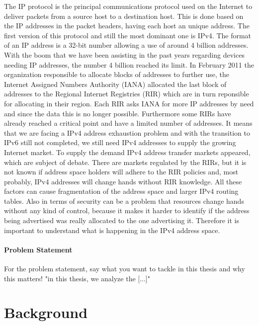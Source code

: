 \documentclass[11pt,a4paper]{scrreprt}
\begin{document}
The IP protocol is the principal communications protocol used on the Internet to deliver packets from a source host to a destination host. This is done based on the IP addresses in the packet headers, having each host an unique address. 
The first version of this protocol and still the most dominant one is IPv4. The format of an IP address is a 32-bit number allowing a use of around 4 billion addresses. With the boom that we have been assisting in the past years regarding devices needing IP addresses, the number 4 billion reached its limit.     
In February 2011 the organization responsible to allocate blocks of addresses to further use, the Internet Assigned Numbers Authority (IANA) allocated the last block of addresses to the Regional Internet Registries (RIR) which are in turn reponsible for allocating in their region. Each RIR asks IANA for more IP addresses by need and since the data this is no longer possible. Furthermore some RIRs have already reached a critical point and have a limited number of addresses. It means that we are facing a IPv4 address exhaustion problem and with the transition to IPv6 still not completed, we still need IPv4 addresses to supply the growing Internet market. To supply the demand IPv4 address transfer markets appeared, which are subject of debate. There are markets regulated by the RIRs, but it is not known if address space holders will adhere to the RIR policies and, most probably, IPv4 addresses will change hands without RIR knowledge.
All these factors can cause fragmentation of the address space and larger IPv4 routing tables. Also in terms of security can be a problem that resources change hands without any kind of control, because it makes it harder to identify if the address being advertised was really allocated to the one advertising it. 
Therefore it is important to understand what is happening in the IPv4 address space. 

\subsubsection{Problem Statement}




For the problem statement, say what you want to tackle in this thesis
and why this matters! "in this thesis, we analyze the [...]"

\chapter{Background}
\end{document}
